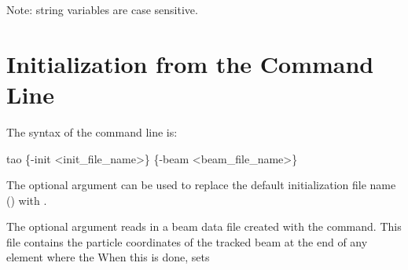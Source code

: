 Note: string variables are case sensitive.

\section{Initialization from the Command Line}
\label{s:command_line} 

The syntax of the command line is:
\begin{example}
  tao \{-init <init_file_name>\} \{-beam <beam_file_name>\}
\end{example}
The  optional argument can be used to replace the default
initialization file name () with .

The  optional argument reads in a beam data file created with the
 command. This file contains the particle coordinates of the
tracked beam at the end of any element where the  When this is done, \tao sets 
